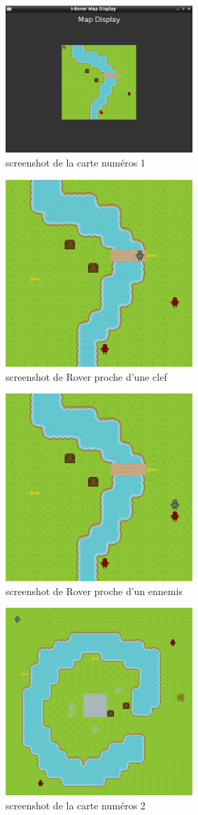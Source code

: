 \documentclass[a4paper 12pts]{article}
\begin{document}
\vspace{0.25cm}
\begin{figure}[h]
   \includegraphics[width=200pt]{Illustration/screens/screen1.png}
	\caption{screenshot de la carte numéros 1}
\end{figure}
\vspace{0.25cm}
\begin{figure}[h]
   \includegraphics[width=200pt]{Illustration/screens/screen2.png}
\caption{screenshot de Rover proche d'une clef}
\end{figure}

\newpage
\begin{figure}[h]   
	\includegraphics[width=200pt]{Illustration/screens/screen3.png}
\caption{screenshot de Rover proche d'un ennemis}
\end{figure}
\begin{figure}[h!]
	\includegraphics[width=200pt]{Illustration/screens/screen4.png}
\caption{screenshot de la carte numéros 2}
\end{figure}
\end{document}
